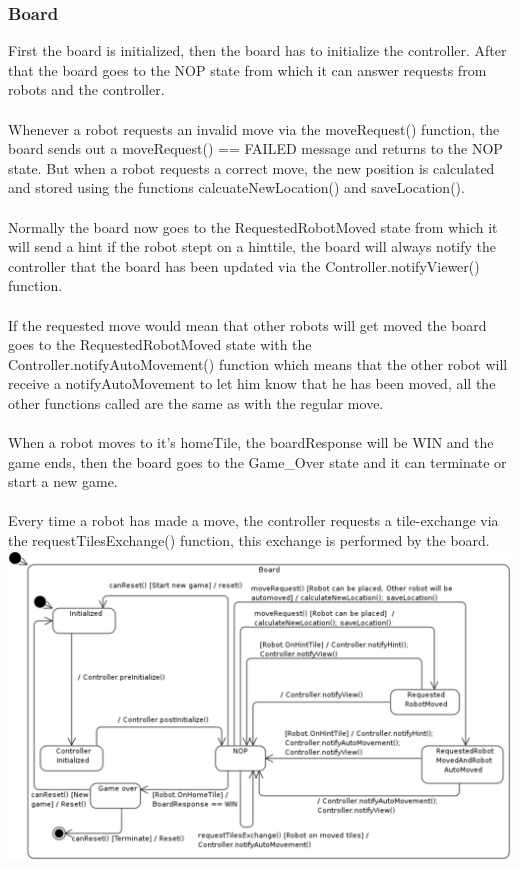     \subsubsection{Board}
	First the board is initialized, then the board has to initialize the controller. After that the board goes to the NOP state from which it can answer requests from robots and the controller. \\
\\
Whenever a robot requests an invalid move via the moveRequest() function, the board sends out a moveRequest() == FAILED message and returns to the NOP state. But when a robot requests a correct move, the new position is calculated and stored using the functions calcuateNewLocation() and saveLocation(). \\
\\
Normally the board now goes to the RequestedRobotMoved state from which it will send a hint if the robot stept on a hinttile, the board will always notify the controller that the board has been updated via the Controller.notifyViewer() function.\\
\\
If the requested move would mean that other robots will get moved the board goes to the RequestedRobotMoved state with the Controller.notifyAutoMovement() function which means that the other robot will receive a notifyAutoMovement to let him know that he has been moved, all the other functions called are the same as with the regular move.\\
\\
When a robot moves to it's homeTile, the boardResponse will be WIN and the game ends, then the board goes to the Game\_Over state and it can terminate or start a new game.\\
\\
Every time a robot has made a move, the controller requests a tile-exchange via the requestTilesExchange() function, this exchange is performed by the board.\\
	
	\includegraphics[width=\linewidth]{statecharts/board.pdf}

